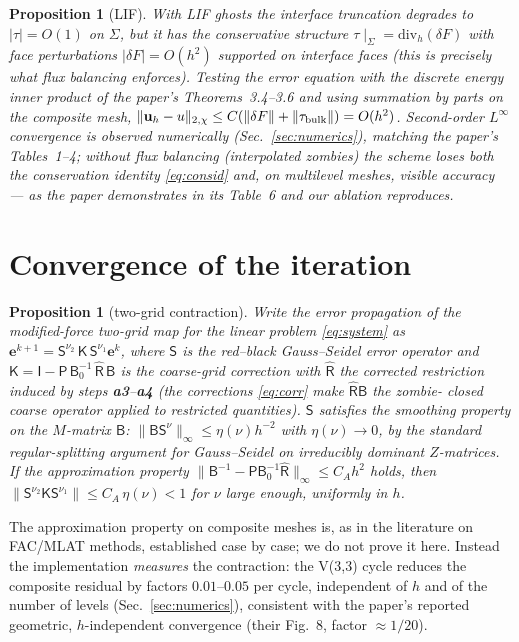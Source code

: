 \documentclass[11pt]{article}
\newtheorem{proposition}[theorem]{Proposition}
\theoremstyle{remark}
\begin{document}
\begin{proposition}[LIF]\label{prop:lif}
With LIF ghosts the interface truncation degrades to $|\tau|=O(1)$ on
$\Sigma$, but it has the conservative structure
$\tau\mid_\Sigma = \mathrm{div}_h(\delta F)$ with face perturbations
$|\delta F|=O(h^2)$ supported on interface faces (this is precisely what
flux balancing enforces).  Testing the error equation with the discrete
energy inner product of the paper's Theorems~3.4--3.6 and using
summation by parts on the composite mesh,
$\|\mathbf u_h-u\|_{2,\chi}\le C(\|\delta F\|+\|\tau_{\rm bulk}\|)=O(h^2)$.
Second-order $L^\infty$ convergence is observed numerically
(Sec.~\ref{sec:numerics}), matching the paper's Tables~1--4; without
flux balancing (interpolated zombies) the scheme loses both the
conservation identity \eqref{eq:consid} and, on multilevel meshes,
visible accuracy --- as the paper demonstrates in its Table~6 and our
ablation reproduces.
\end{proposition}

\section{Convergence of the iteration}

\begin{proposition}[two-grid contraction]\label{prop:tg}
Write the error propagation of the modified-force two-grid map for the
\emph{linear} problem \eqref{eq:system} as
$\mathbf e^{k+1}=\mathsf S^{\nu_2}\,
\mathsf K\,\mathsf S^{\nu_1}\mathbf e^{k}$, where $\mathsf S$ is the
red--black Gauss--Seidel error operator and $\mathsf K=\mathsf I-
\mathsf P\,\mathsf B_0^{-1}\,\widehat{\mathsf R}\,\mathsf B$ is the
coarse-grid correction with $\widehat{\mathsf R}$ the corrected
restriction induced by steps \textbf{a3}--\textbf{a4} (the corrections
\eqref{eq:corr} make $\widehat{\mathsf R}\mathsf B$ the \emph{zombie-
closed} coarse operator applied to restricted quantities).
$\mathsf S$ satisfies the smoothing property on the $M$-matrix
$\mathsf B$:
$\|\mathsf B\mathsf S^{\nu}\|_\infty\le \eta(\nu)h^{-2}$ with
$\eta(\nu)\to0$, by the standard regular-splitting argument for
Gauss--Seidel on irreducibly dominant $Z$-matrices.  If the
approximation property
$\|\mathsf B^{-1}-\mathsf P\mathsf B_0^{-1}\widehat{\mathsf R}\|_\infty
\le C_A h^{2}$ holds, then
$\|\mathsf S^{\nu_2}\mathsf K\mathsf S^{\nu_1}\|\le C_A\,\eta(\nu)<1$
for $\nu$ large enough, uniformly in $h$.
\end{proposition}

The approximation property on composite meshes is, as in the literature
on FAC/MLAT methods, established case by case; we do not prove it here.
Instead the implementation \emph{measures} the contraction: the V(3,3)
cycle reduces the composite residual by factors $0.01$--$0.05$ per
cycle, independent of $h$ and of the number of levels
(Sec.~\ref{sec:numerics}), consistent with the paper's reported
geometric, $h$-independent convergence (their Fig.~8, factor
$\approx1/20$).
\end{document}
